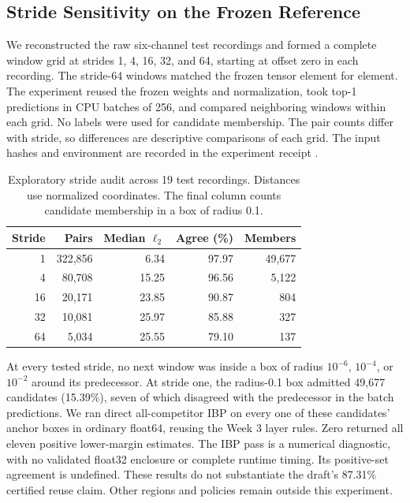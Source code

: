 \documentclass[journal]{IEEEtran}
\begin{document}
\subsection{Stride Sensitivity on the Frozen Reference}
We reconstructed the raw six-channel test recordings and formed a complete window grid at strides 1, 4, 16, 32, and 64, starting at offset zero in each recording. The stride-64 windows matched the frozen tensor element for element. The experiment reused the frozen weights and normalization, took top-1 predictions in CPU batches of 256, and compared neighboring windows within each grid. No labels were used for candidate membership. The pair counts differ with stride, so differences are descriptive comparisons of each grid. The input hashes and environment are recorded in the experiment receipt \cite{localstride}.
\begin{table}[t]
\caption{Exploratory stride audit across 19 test recordings. Distances use normalized coordinates. The final column counts candidate membership in a box of radius 0.1.}
\label{tab:stride}
\centering\small
\begin{tabular}{rrrrr}\toprule
Stride & Pairs & Median $\ell_2$ & Agree (\%) & Members\\\midrule
1 & 322,856 & 6.34 & 97.97 & 49,677\\
4 & 80,708 & 15.25 & 96.56 & 5,122\\
16 & 20,171 & 23.85 & 90.87 & 804\\
32 & 10,081 & 25.97 & 85.88 & 327\\
64 & 5,034 & 25.55 & 79.10 & 137\\\bottomrule
\end{tabular}
\end{table}
At every tested stride, no next window was inside a box of radius $10^{-6}$, $10^{-4}$, or $10^{-2}$ around its predecessor. At stride one, the radius-0.1 box admitted 49,677 candidates (15.39\%), seven of which disagreed with the predecessor in the batch predictions. We ran direct all-competitor IBP on every one of these candidates' anchor boxes in ordinary float64, reusing the Week 3 layer rules. Zero returned all eleven positive lower-margin estimates. The IBP pass is a numerical diagnostic, with no validated float32 enclosure or complete runtime timing. Its positive-set agreement is undefined. These results do not substantiate the draft's 87.31\% certified reuse claim. Other regions and policies remain outside this experiment.
\end{document}
